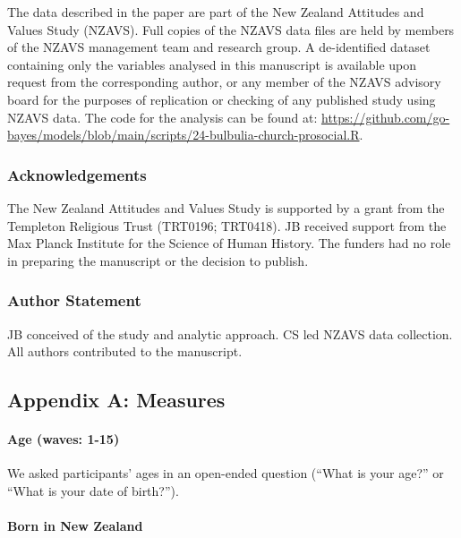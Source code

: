 \documentclass[
  single column]{article}
\let\oldparagraph\paragraph
\renewcommand{\paragraph}[1]{\oldparagraph{#1}\mbox{}}
\begin{document}
The data described in the paper are part of the New Zealand Attitudes
and Values Study (NZAVS). Full copies of the NZAVS data files are held
by members of the NZAVS management team and research group. A
de-identified dataset containing only the variables analysed in this
manuscript is available upon request from the corresponding author, or
any member of the NZAVS advisory board for the purposes of replication
or checking of any published study using NZAVS data. The code for the
analysis can be found at:
\url{https://github.com/go-bayes/models/blob/main/scripts/24-bulbulia-church-prosocial.R}.

\subsubsection{Acknowledgements}\label{acknowledgements}

The New Zealand Attitudes and Values Study is supported by a grant from
the Templeton Religious Trust (TRT0196; TRT0418). JB received support
from the Max Planck Institute for the Science of Human History. The
funders had no role in preparing the manuscript or the decision to
publish.

\subsubsection{Author Statement}\label{author-statement}

JB conceived of the study and analytic approach. CS led NZAVS data
collection. All authors contributed to the manuscript.

\newpage{}

\subsection{Appendix A: Measures}\label{appendix-measures}

\paragraph{Age (waves: 1-15)}\label{age-waves-1-15}

We asked participants' ages in an open-ended question (``What is your
age?'' or ``What is your date of birth?'').

\paragraph{Born in New Zealand}\label{born-in-new-zealand}
\end{document}
